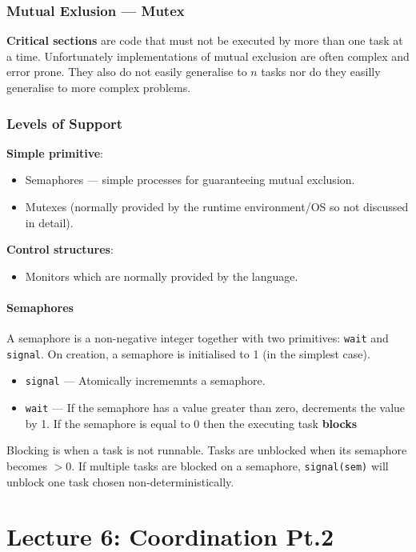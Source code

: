 \documentclass{article}
\begin{document}
\subsubsection{Mutual Exlusion --- Mutex}
\textbf{Critical sections} are code that must not be executed by more than one task at a time.
Unfortunately implementations of mutual exclusion are often complex and error prone.
They also do not easily generalise to $n$ tasks nor do they easilly generalise to more complex problems.

\subsubsection{Levels of Support}
\textbf{Simple primitive}:
\begin{itemize}
	\item Semaphores --- simple processes for guaranteeing mutual exclusion.
	\item Mutexes (normally provided by the runtime environment/OS so not discussed in detail).
\end{itemize}
\textbf{Control structures}:
\begin{itemize}
	\item Monitors which are normally provided by the language.
\end{itemize}

\paragraph{Semaphores}
A semaphore is a non-negative integer together with two primitives: {\tt wait} and {\tt signal}.
On creation, a semaphore is initialised to 1 (in the simplest case).
\begin{itemize}
	\item {\tt signal} --- Atomically incrememnts a semaphore.
	\item {\tt wait} --- If the semaphore has a value greater than zero, decrements the value by 1.
If the semaphore is equal to 0 then the executing task \textbf{blocks}
\end{itemize}
Blocking is when a task is not runnable.
Tasks are unblocked when its semaphore becomes $>0$.
If multiple tasks are blocked on a semaphore, {\tt signal(sem)} will unblock one task chosen non-deterministically.

\maketitle
\section{Lecture 6: Coordination Pt.2}
\end{document}
